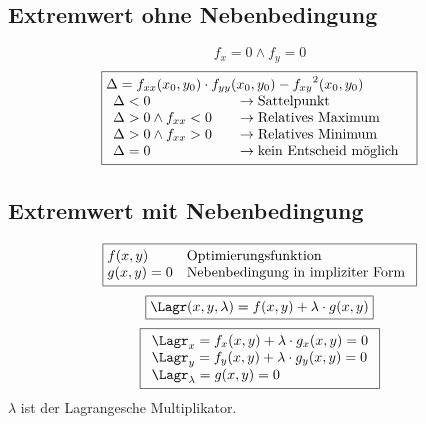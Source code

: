 \subsection{Extremwert ohne Nebenbedingung}
\[ \boxed{f_x = 0 \land f_y = 0} \]
\[ \boxed{\begin{array}{@{}l}
\Delta = f_{xx}(x_0, y_0) \cdot f_{yy}(x_0, y_0) - {f_{xy}}^2(x_0, y_0) \\
\begin{array}{ll}
\Delta < 0 \quad                    & \rightarrow \text{Sattelpunkt} \\
\Delta > 0 \land f_{xx} < 0 \quad   & \rightarrow \text{Relatives Maximum} \\
\Delta > 0 \land f_{xx} > 0 \quad   & \rightarrow \text{Relatives Minimum} \\
\Delta = 0                  \quad   & \rightarrow \text{kein Entscheid möglich}
\end{array}\end{array}} \]

\subsection{Extremwert mit Nebenbedingung}
\[ \boxed{\begin{array}{@{}ll}
f(x,y) & \text{Optimierungsfunktion} \\
g(x,y) = 0 & \text{Nebenbedingung in impliziter Form} \\
\end{array}} \]
\[ \boxed{\Lagr(x,y,\lambda) = f(x,y) + \lambda \cdot g(x,y)} \]
\[ \boxed{\begin{array}{l}
\Lagr_x = f_x(x,y) + \lambda \cdot g_x(x,y) = 0 \\
\Lagr_y = f_y(x,y) + \lambda \cdot g_y(x,y) = 0 \\
\Lagr_\lambda = g(x,y) = 0 \\
\end{array}} \]
$\lambda$ ist der Lagrangesche Multiplikator. 

